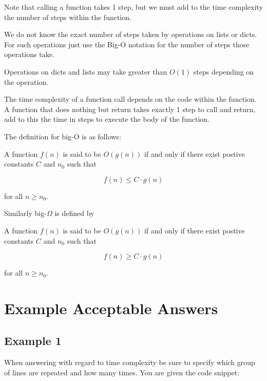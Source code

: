 \documentclass{article}
\begin{document}
Note that calling a function takes 1 step, but we must add
to the time complexity the number of steps within the function.

We do not know the exact number of steps taken by operations
on lists or dicts.  For such operations just use the Big-O
notation for the number of steps those operations take.

Operations on dicts and lists may take greater than $O(1)$ steps
depending on the operation.

The time complexity of a function call depends on the code within the
function.  A function that does nothing but return takes exactly 1
step to call and return, add to this the time in steps to execute the
body of the function.

The definition for big-O is as follows:

\begin{center}
\begin{minipage}{3in}
A function $f(n)$ is said to be $O(g(n))$ if 
and only if there exist postive constants $C$ and $n_0$ such that

\[
  f(n) \leq C \cdot g(n)
\]

for all $n \geq n_0$.
\end{minipage}
\end{center}

Similarly big-$\Omega$ is defined by

\begin{center}
\begin{minipage}{3in}
A function $f(n)$ is said to be $O(g(n))$ if 
and only if there exist postive constants $C$ and $n_0$ such that

\[
  f(n) \geq C \cdot g(n)
\]

for all $n \geq n_0$.
\end{minipage}
\end{center}


\newpage

\section{Example Acceptable Answers}

\subsection{Example 1}

When answering with regard to time complexity be sure to specify
which group of lines are repeated and how many times. 
You are given the code snippet:
\end{document}

